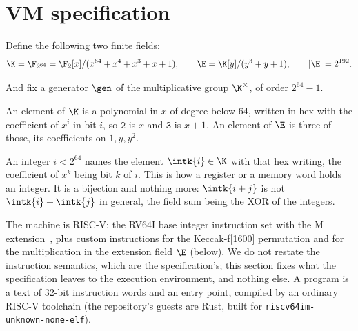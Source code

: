 \section{VM specification}\label{sec:vm}

Define the following two finite fields:
\[
  \K=\F_{2^{64}}=\F_2[x]/(x^{64}+x^4+x^3+x+1),
  \qquad
  \E=\K[y]/(y^3+y+1),
  \qquad |\E|=2^{192}.
\]

And fix a generator $\gen$ of the multiplicative group $\K^{\times}$, of order $2^{64}-1$.

An element of $\K$ is a polynomial in $x$ of degree below $64$, written in hex with the coefficient of $x^{i}$ in bit $i$, so $\mathtt{2}$ is $x$ and $\mathtt{3}$ is $x+1$. An element of $\E$ is three of those, its coefficients on $1,y,y^{2}$.

An integer $i<2^{64}$ names the element $\intk{i}\in\K$ with that hex writing, the coefficient of $x^{k}$ being bit $k$ of $i$. This is how a register or a memory word holds an integer. It is a bijection and nothing more: $\intk{i+j}$ is not $\intk{i}+\intk{j}$ in general, the field sum being the XOR of the integers.

\vspace{5mm}

The machine is RISC-V: the RV64I base integer instruction set with the M extension~\cite{riscv}, plus custom instructions for the Keccak-f[1600] permutation and for the multiplication in the extension field $\E$ (below). We do not restate the instruction semantics, which are the specification's; this section fixes what the specification leaves to the execution environment, and nothing else. A program is a text of $32$-bit instruction words and an entry point, compiled by an ordinary RISC-V toolchain (the repository's guests are Rust, built for \texttt{riscv64im-unknown-none-elf}).

